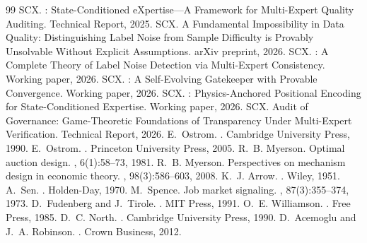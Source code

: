 \documentclass[12pt,a4paper]{article}
\theoremstyle{definition}
\begin{document}
\begin{thebibliography}{99}
SCX.
: State-Conditioned eXpertise---A Framework for Multi-Expert Quality Auditing.
\newblock Technical Report, 2025.
SCX.
\newblock A Fundamental Impossibility in Data Quality: Distinguishing Label Noise from Sample Difficulty is Provably Unsolvable Without Explicit Assumptions.
\newblock arXiv preprint, 2026.
SCX.
: A Complete Theory of Label Noise Detection via Multi-Expert Consistency.
\newblock Working paper, 2026.
SCX.
: A Self-Evolving Gatekeeper with Provable Convergence.
\newblock Working paper, 2026.
SCX.
: Physics-Anchored Positional Encoding for State-Conditioned Expertise.
\newblock Working paper, 2026.
SCX.
 Audit of Governance: Game-Theoretic Foundations of Transparency Under Multi-Expert Verification.
\newblock Technical Report, 2026.
E.~Ostrom.
.
\newblock Cambridge University Press, 1990.
E.~Ostrom.
.
\newblock Princeton University Press, 2005.
R.~B. Myerson.
\newblock Optimal auction design.
, 6(1):58--73, 1981.
R.~B. Myerson.
\newblock Perspectives on mechanism design in economic theory.
, 98(3):586--603, 2008.
K.~J. Arrow.
.
\newblock Wiley, 1951.
A.~Sen.
.
\newblock Holden-Day, 1970.
M.~Spence.
\newblock Job market signaling.
, 87(3):355--374, 1973.
D.~Fudenberg and J.~Tirole.
.
\newblock MIT Press, 1991.
O.~E. Williamson.
.
\newblock Free Press, 1985.
D.~C. North.
.
\newblock Cambridge University Press, 1990.
D.~Acemoglu and J.~A. Robinson.
.
\newblock Crown Business, 2012.

\end{thebibliography}
\end{document}

